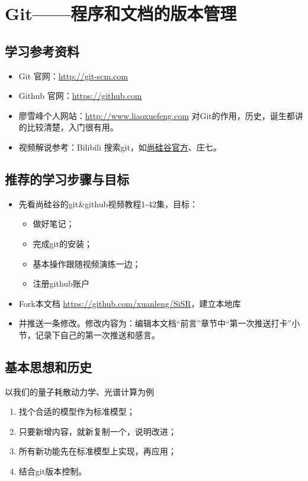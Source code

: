 \chapter{Git——程序和文档的版本管理}
\section{学习参考资料}
\begin{itemize}
\item Git 官网：\url{http://git-scm.com}

\item Github 官网：\url{https://github.com}

\item 廖雪峰个人网站：\url{http://www.liaoxuefeng.com} 对Git的作用，历史，诞生都讲的比较清楚，入门很有用。

\item 视频解说参考：Bilibili 搜索git，如\href{https://www.bilibili.com/video/BV1pW411A7a5?from=search&seid=3815767452396308043}{尚硅谷官方}、庄七。
\end{itemize}


\section{推荐的学习步骤与目标}
\begin{itemize}
\item 先看尚硅谷的git\&github视频教程1-42集，目标：
	\begin{itemize}
	\item 做好笔记；
	\item 完成git的安装；
	\item 基本操作跟随视频演练一边；
	\item 注册github账户
 	\end{itemize}
\item Fork本文档 \url{https://github.com/xuanleng/SiSR}，建立本地库
\item 并推送一条修改。修改内容为：编辑本文档“前言”章节中“第一次推送打卡”小节，记录下自己的第一次推送和感言。
\end{itemize}


\section{基本思想和历史}
以我们的量子耗散动力学、光谱计算为例
\begin{enumerate}
\item 找个合适的模型作为标准模型；
\item 只要新增内容，就新复制一个，说明改进；
\item 所有新功能先在标准模型上实现，再应用；
\item 结合git版本控制。
\end{enumerate}



